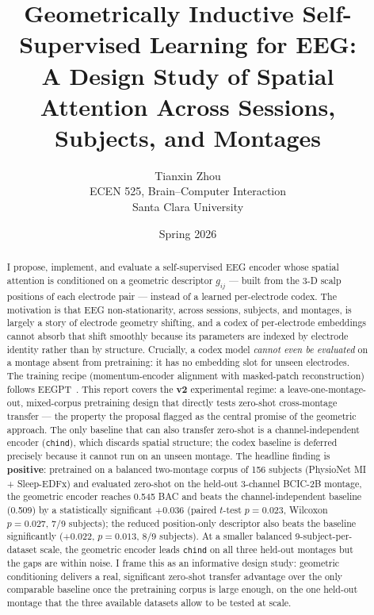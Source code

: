 \documentclass[11pt]{article}
\title{Geometrically Inductive Self-Supervised Learning for EEG:\\
       A Design Study of Spatial Attention Across Sessions,\\
       Subjects, and Montages}
\author{Tianxin Zhou\\
        ECEN 525, Brain--Computer Interaction\\
        Santa Clara University}
\date{Spring 2026}
\begin{document}
\maketitle

\begin{abstract}
I propose, implement, and evaluate a self-supervised EEG encoder whose spatial
attention is conditioned on a geometric descriptor $g_{ij}$ --- built from the
3-D scalp positions of each electrode pair --- instead of a learned
per-electrode codex. The motivation is that EEG non-stationarity, across
sessions, subjects, and montages, is largely a story of electrode geometry
shifting, and a codex of per-electrode embeddings cannot absorb that shift
smoothly because its parameters are indexed by electrode identity rather than
by structure. Crucially, a codex model \emph{cannot even be evaluated} on a
montage absent from pretraining: it has no embedding slot for unseen
electrodes. The training recipe (momentum-encoder alignment with masked-patch
reconstruction) follows EEGPT~\cite{wang2024eegpt}. This report covers the
\textbf{v2} experimental regime: a leave-one-montage-out, mixed-corpus
pretraining design that directly tests zero-shot cross-montage transfer ---
the property the proposal flagged as the central promise of the geometric
approach. The only baseline that can also transfer zero-shot is a
channel-independent encoder (\texttt{chind}), which discards spatial
structure; the codex baseline is deferred precisely because it cannot run on
an unseen montage. The headline finding is \textbf{positive}: pretrained on a
balanced two-montage corpus of 156 subjects (PhysioNet MI + Sleep-EDFx) and
evaluated zero-shot on the held-out 3-channel BCIC-2B montage, the geometric
encoder reaches 0.545 BAC and beats the channel-independent baseline (0.509)
by a statistically significant $+0.036$ (paired $t$-test $p = 0.023$,
Wilcoxon $p = 0.027$, 7/9 subjects); the reduced position-only descriptor also
beats the baseline significantly ($+0.022$, $p = 0.013$, 8/9 subjects). At a
smaller balanced 9-subject-per-dataset scale, the geometric encoder leads
\texttt{chind} on all three held-out montages but the gaps are within noise.
I frame this as an informative design study: geometric conditioning delivers a
real, significant zero-shot transfer advantage over the only comparable
baseline once the pretraining corpus is large enough, on the one held-out
montage that the three available datasets allow to be tested at scale.
\end{abstract}
\end{document}
